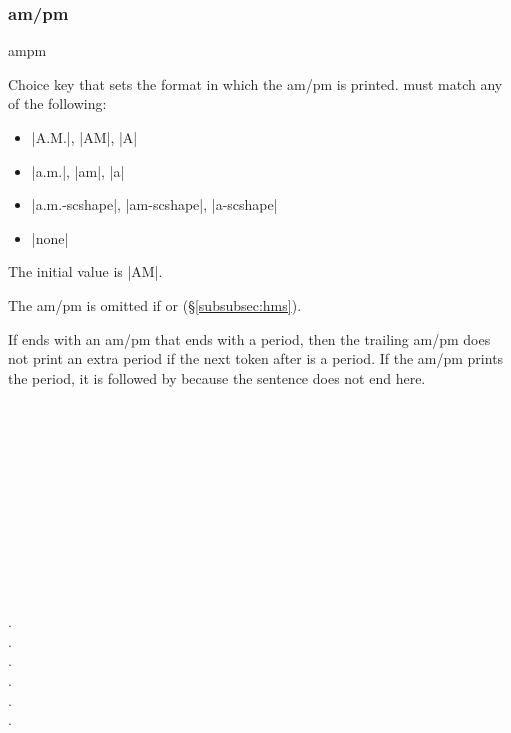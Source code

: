 \documentclass{beerydoc}
\begin{document}
\subsubsection{am/pm}
\label{subsubsec:ampm}

\begin{codedoc}{ampm}
  \begin{syntax}
  \end{syntax}
  Choice key that sets the format in which the am/pm is printed.
   must match any of the following:
  \begin{itemize}
    \item |A.M.|, |AM|, |A|
    \item |a.m.|, |am|, |a|
    \item |a.m.-scshape|, |am-scshape|, |a-scshape|
    \item |none|
  \end{itemize}
  The initial value is |AM|.

  The am/pm is omitted if  or 
  (\S\ref{subsubsec:hms}).

  If  ends with an am/pm that ends with a period, then the trailing
  am/pm does not print an extra period if the next token after  is a
  period.
  If the am/pm prints the period, it is followed by  because the sentence
  does not end here.
  \begin{codedemo}
    \\
    \\
    \\
    \\
    \\
    \\
    \\
    \\
    \\
    \\
  \end{codedemo}
\end{codedoc}
\begin{codedemo}
  .\\
  .\\
  .\\
  .\\
  .\\
  .
\end{codedemo}
\end{document}
